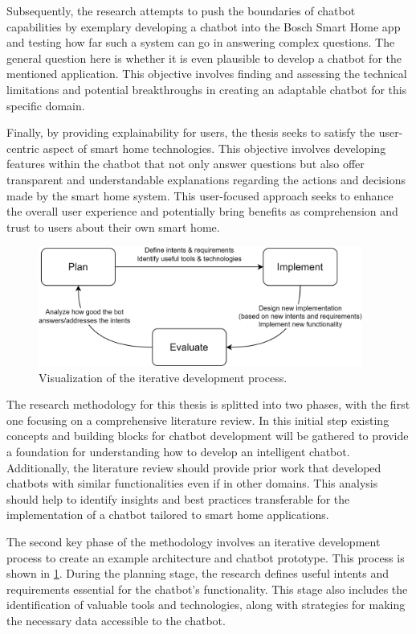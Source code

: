 Subsequently, the research attempts to push the boundaries of chatbot capabilities by exemplary developing a chatbot into the Bosch Smart Home app and testing how far such a system can go in answering complex questions. The general question here is whether it is even plausible to develop a chatbot for the mentioned application. This objective involves finding and assessing the technical limitations and potential breakthroughs in creating an adaptable chatbot for this specific domain.

Finally, by providing explainability for users, the thesis seeks to satisfy the user-centric aspect of smart home technologies. This objective involves developing features within the chatbot that not only answer questions but also offer transparent and understandable explanations regarding the actions and decisions made by the smart home system. This user-focused approach seeks to enhance the overall user experience and potentially bring benefits as comprehension and trust to users about their own smart home. 

\begin{figure}[b]
\centering
\includegraphics[width=0.95\textwidth]{graphics/iterative-design.png}
\caption{Visualization of the iterative development process.}
\label{fig:iterative-design}
\end{figure}
The research methodology for this thesis is splitted into two phases, with the first one focusing on a comprehensive literature review.
In this initial step existing concepts and building blocks for chatbot development will be gathered to provide a foundation for understanding how to develop an intelligent chatbot.
Additionally, the literature review should provide prior work that developed chatbots with similar functionalities even if in other domains.
This analysis should help to identify insights and best practices transferable for the implementation of a chatbot tailored to smart home applications.

The second key phase of the methodology involves an iterative development process to create an example architecture and chatbot prototype. 
This process is shown in \cref{fig:iterative-design}.
During the planning stage, the research defines useful intents and requirements essential for the chatbot's functionality. 
This stage also includes the identification of valuable tools and technologies, along with strategies for making the necessary data accessible to the chatbot.

